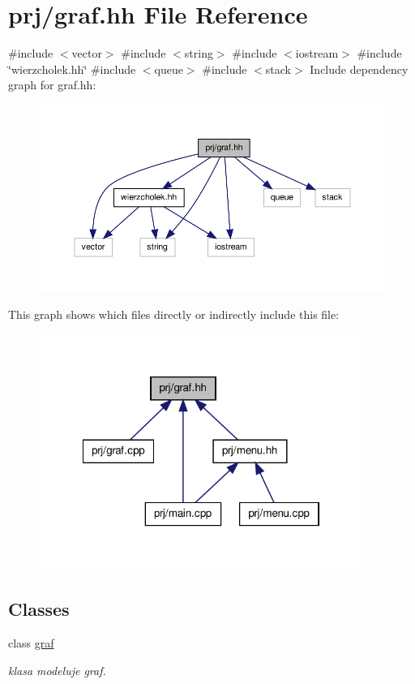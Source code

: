 \hypertarget{graf_8hh}{\section{prj/graf.hh \-File \-Reference}
\label{graf_8hh}
}
{\ttfamily \#include $<$vector$>$}\*
{\ttfamily \#include $<$string$>$}\*
{\ttfamily \#include $<$iostream$>$}\*
{\ttfamily \#include \char`\"{}wierzcholek.\-hh\char`\"{}}\*
{\ttfamily \#include $<$queue$>$}\*
{\ttfamily \#include $<$stack$>$}\*
\-Include dependency graph for graf.\-hh\-:\nopagebreak
\begin{figure}[H]
\begin{center}
\leavevmode
\includegraphics[width=350pt]{graf_8hh__incl}
\end{center}
\end{figure}
\-This graph shows which files directly or indirectly include this file\-:
\nopagebreak
\begin{figure}[H]
\begin{center}
\leavevmode
\includegraphics[width=297pt]{graf_8hh__dep__incl}
\end{center}
\end{figure}
\subsection*{\-Classes}
\begin{DoxyCompactItemize}
\item 
class \hyperlink{classgraf}{graf}
\begin{DoxyCompactList}\small\item\em klasa modeluje graf. \end{DoxyCompactList}\end{DoxyCompactItemize}
